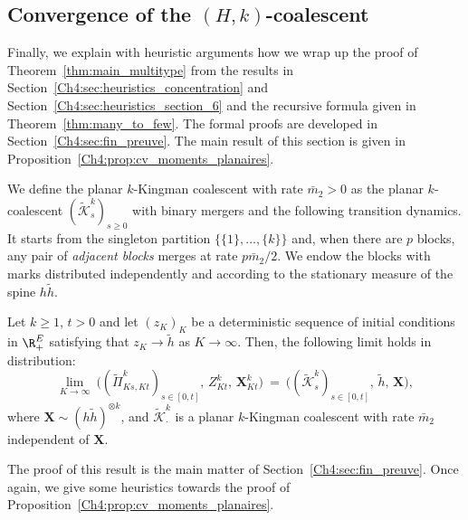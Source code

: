 \begin{refsegment}
\subsection{Convergence of the $(H,k)$-coalescent}
\label{Ch4:sec:heuristics_many_to_few}

Finally, we explain with heuristic arguments how we wrap up the proof of Theorem~\ref{thm:main_multitype} from the results in Section~\ref{Ch4:sec:heuristics_concentration} and Section~\ref{Ch4:sec:heuristics_section_6} and the recursive formula given in Theorem~\ref{thm:many_to_few}. The formal proofs are developed in Section~\ref{Ch4:sec:fin_preuve}. The main result of this section is given in Proposition~\ref{Ch4:prop:cv_moments_planaires}.



We define the planar $k$-Kingman coalescent with rate $\bar{m}_2>0$ as the planar $k$-coalescent $(\tilde{\mathcal{K}}^k_{s})_{ s\geq 0}$ with binary mergers and the following transition dynamics.
It starts from the singleton partition $\{\{1\},\ldots,\{k\}\}$ and, when there are $p$ blocks, any pair of \textit{adjacent blocks} merges at rate $p \bar{m}_2 / 2$.
We endow the blocks with marks distributed independently and according to the stationary measure of the spine $h\tilde h$.


\begin{prop}\label{Ch4:prop:cv_moments_planaires} 
  
  Let $k\geq 1$, $t>0$
and let $(z_K)_K$ be a deterministic sequence of initial conditions in $\R_+^E$ satisfying that $z_K\to \tilde h$
    as $K\to\infty$. Then, the following limit holds in distribution: 
    \begin{equation}\label{Ch4:eq:def_limit_measure}
        \lim_{K\to\infty}\  
         \big((\tilde{\Pi}^k_{Ks,Kt})_{s\in[0,t]},\, Z^k_{Kt},\, \bm X^k_{Kt}\big)
        \ = \   
       \big((\tilde{\mathcal{K}}^{k}_{s})_{s\in[0,t]},\, \tilde h,\, \bm X \big),
    \end{equation}
    where $\bm X\sim (h\tilde h)^{\otimes k}$, and $\tilde{\mathcal{K}}^k_\cdot$ is a planar $k$-Kingman coalescent with rate $\bar{m}_2$ independent of $\bm{X}$.
\end{prop}

The proof of this result is the main matter of Section~\ref{Ch4:sec:fin_preuve}.    Once again, we give some heuristics towards the proof of Proposition~\ref{Ch4:prop:cv_moments_planaires}.



\end{refsegment}
